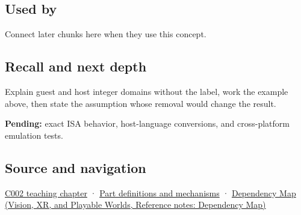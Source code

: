 \subsection{Used by}\label{appendix-33e7a011b684-used-by}

\hypertarget{appendix-33e7a011b684-used-by}{}

Connect later chunks here when they use this concept.

\subsection{Recall and next depth}\label{appendix-33e7a011b684-recall-and-next-depth}

\hypertarget{appendix-33e7a011b684-recall-and-next-depth}{}

Explain guest and host integer domains without the label, work the example above, then state the assumption whose removal would change the result.

\textbf{Pending:} exact ISA behavior, host-language conversions, and cross-platform emulation tests.

\subsection{Source and navigation}\label{appendix-33e7a011b684-source-and-navigation}

\hypertarget{appendix-33e7a011b684-source-and-navigation}{}

\hyperref[01-foundations-i-ch001-arithmetic-becomes-a-policy]{C002 teaching chapter} · \hyperref[appendix-fd090d982a15]{Part definitions and mechanisms} · \href{../07-Vision-XR-and-Playable-Worlds/main.pdf\#nameddest=appendix-4ad47bdd269a}{Dependency Map (Vision, XR, and Playable Worlds, Reference notes: Dependency Map)}
